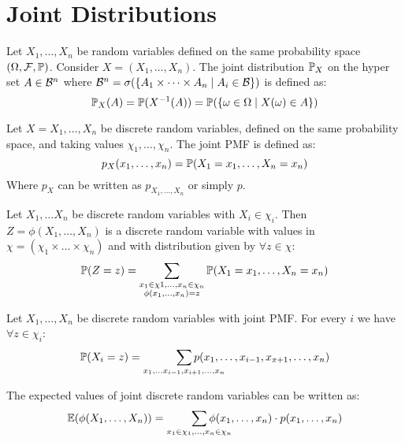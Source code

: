 \section{Joint Distributions}
\begin{definition*}
  Let \(X_1, \ldots, X_n\) be random variables defined on the same probability space \((\O, \F, \P)\). Consider \(X = (X_1, \ldots, X_n)\). The joint distribution \(\P_X\) on the hyper set \(A \in \B^n\) where \(\B^n = \sigma(\{A_1 \times \cdots \times A_n \mid A_i \in \B\})\) is defined as:
  \[\P_X(A) = \P(X^{-1}(A)) = \P(\{\omega \in \O \mid X(\omega) \in A\})\]
\end{definition*}

\begin{ddefinition*}
  Let \(X = X_1, \ldots, X_n\) be discrete random variables, defined on the same probability space, and taking values \(\chi_1, \ldots, \chi_n\). The joint PMF is defined as:
  \[p_{X}(x_1, \ldots, x_n) = \P(X_1 = x_1, \ldots, X_n = x_n)\]
  Where \(p_X\) can be written as \(p_{X_1, \ldots, X_n}\) or simply \(p\).
\end{ddefinition*}

\begin{proposition}
  Let \(X_1, \ldots X_n\) be discrete random variables with \(X_i \in \chi_i\). Then \(Z = \phi(X_1, \ldots, X_n)\) is a discrete random variable with values in \(\chi = (\chi_1 \times \ldots \times \chi_n)\) and with distribution given by \(\forall z \in \chi\):
  \[\P(Z = z) = \sum_{\substack{x_1 \in \chi1, \ldots, x_n \in \chi_n \\ \phi(x_1, \ldots, x_n) = z}} \P(X_1 = x_1, \ldots, X_n = x_n)\]
\end{proposition}

\begin{dtheorem*}
  Let \(X_1, \ldots, X_n\) be discrete random variables with joint PMF. For every \(i\) we have \(\forall z \in \chi_i\):
  \[\P(X_i = z) = \smashoperator[r]{\sum_{x_1, \ldots x_{i-1}, x_{i+1}, \ldots, x_n}} p(x_1, \ldots, x_{i-1}, x_{x+1}, \ldots, x_n)\]
\end{dtheorem*}

\begin{proposition}
  The expected values of joint discrete random variables can be written as:
  \[\E(\phi(X_1, \ldots, X_n)) = \smashoperator[r]{\sum_{x_1 \in \chi_1, \ldots, x_n \in \chi_n}} \phi(x_1, \ldots, x_n) \cdot p(x_1, \ldots, x_n)\]
\end{proposition}

